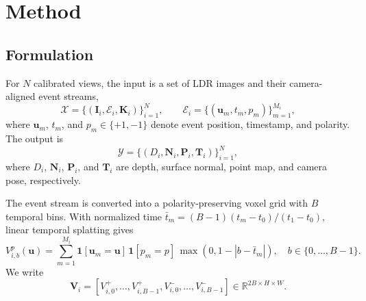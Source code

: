 
\section{Method}
\label{sec:method}

\subsection{Formulation}
\label{sec:formulation}

For $N$ calibrated views, the input is a set of LDR images and their
camera-aligned event streams,
\begin{equation}
    \mathcal{X}=\{(\bm I_i,\mathcal{E}_i,\bm K_i)\}_{i=1}^{N},
    \qquad
    \mathcal{E}_i=\{(\bm u_m,t_m,p_m)\}_{m=1}^{M_i},
    \label{eq:input_definition}
\end{equation}
where $\bm u_m$, $t_m$, and $p_m\in\{+1,-1\}$ denote event position,
timestamp, and polarity. The output is
\begin{equation}
    \mathcal{Y}=\{(D_i,\bm N_i,\bm P_i,\bm T_i)\}_{i=1}^{N},
    \label{eq:output_definition}
\end{equation}
where $D_i$, $\bm N_i$, $\bm P_i$, and $\bm T_i$ are depth, surface
normal, point map, and camera pose, respectively.

The event stream is converted into a polarity-preserving voxel grid with
$B$ temporal bins. With normalized time
$\bar t_m=(B-1)(t_m-t_0)/(t_1-t_0)$, linear temporal splatting gives
\begin{equation}
    V_{i,b}^{p}(\bm u)=
    \sum_{m=1}^{M_i}
    \mathbf{1}[\bm u_m=\bm u]\,
    \mathbf{1}[p_m=p]\,
    \max\!\left(0,1-|b-\bar t_m|\right),
    \quad b\in\{0,\ldots,B-1\}.
    \label{eq:event_voxel_grid}
\end{equation}
We write
\begin{equation}
    \bm V_i=
    [V_{i,0}^{+},\ldots,V_{i,B-1}^{+},
     V_{i,0}^{-},\ldots,V_{i,B-1}^{-}]
    \in\mathbb{R}^{2B\times H\times W}.
    \label{eq:event_voxel_tensor}
\end{equation}

